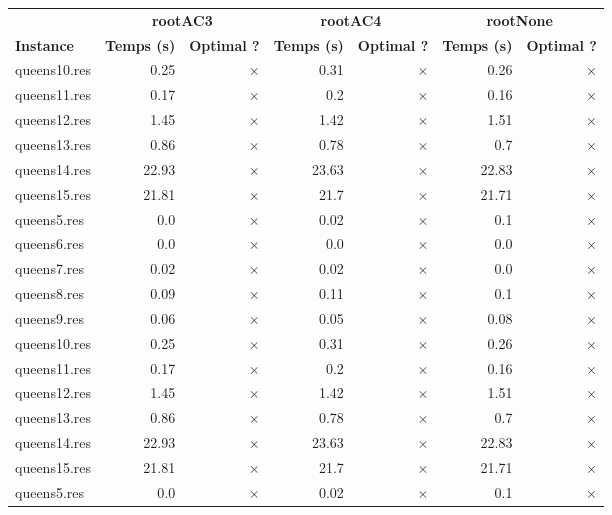 \documentclass{article}
\begin{document}
\begin{center}
\renewcommand{\arraystretch}{1.4} 
\begin{tabular}{l
rrrrrr}
	\hline
 & \multicolumn{2}{c}{\textbf{rootAC3}} & \multicolumn{2}{c}{\textbf{rootAC4}} & \multicolumn{2}{c}{\textbf{rootNone}}\\
\textbf{Instance}  & \textbf{Temps (s)} & \textbf{Optimal ?}  & \textbf{Temps (s)} & \textbf{Optimal ?}  & \textbf{Temps (s)} & \textbf{Optimal ?} \\\hline

queens10.res & 0.25 & 
$\times$
 & 0.31 & 
$\times$
 & 0.26 & 
$\times$
\\
queens11.res & 0.17 & 
$\times$
 & 0.2 & 
$\times$
 & 0.16 & 
$\times$
\\
queens12.res & 1.45 & 
$\times$
 & 1.42 & 
$\times$
 & 1.51 & 
$\times$
\\
queens13.res & 0.86 & 
$\times$
 & 0.78 & 
$\times$
 & 0.7 & 
$\times$
\\
queens14.res & 22.93 & 
$\times$
 & 23.63 & 
$\times$
 & 22.83 & 
$\times$
\\
queens15.res & 21.81 & 
$\times$
 & 21.7 & 
$\times$
 & 21.71 & 
$\times$
\\
queens5.res & 0.0 & 
$\times$
 & 0.02 & 
$\times$
 & 0.1 & 
$\times$
\\
queens6.res & 0.0 & 
$\times$
 & 0.0 & 
$\times$
 & 0.0 & 
$\times$
\\
queens7.res & 0.02 & 
$\times$
 & 0.02 & 
$\times$
 & 0.0 & 
$\times$
\\
queens8.res & 0.09 & 
$\times$
 & 0.11 & 
$\times$
 & 0.1 & 
$\times$
\\
queens9.res & 0.06 & 
$\times$
 & 0.05 & 
$\times$
 & 0.08 & 
$\times$
\\
queens10.res & 0.25 & 
$\times$
 & 0.31 & 
$\times$
 & 0.26 & 
$\times$
\\
queens11.res & 0.17 & 
$\times$
 & 0.2 & 
$\times$
 & 0.16 & 
$\times$
\\
queens12.res & 1.45 & 
$\times$
 & 1.42 & 
$\times$
 & 1.51 & 
$\times$
\\
queens13.res & 0.86 & 
$\times$
 & 0.78 & 
$\times$
 & 0.7 & 
$\times$
\\
queens14.res & 22.93 & 
$\times$
 & 23.63 & 
$\times$
 & 22.83 & 
$\times$
\\
queens15.res & 21.81 & 
$\times$
 & 21.7 & 
$\times$
 & 21.71 & 
$\times$
\\
queens5.res & 0.0 & 
$\times$
 & 0.02 & 
$\times$
 & 0.1 & 
$\times$
\\

\end{tabular}
\end{center}
\end{document}

